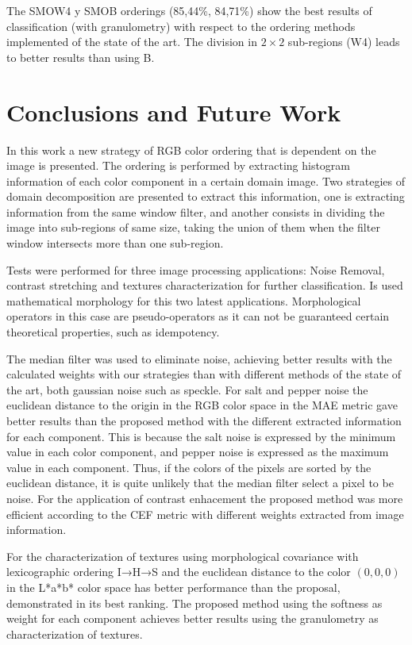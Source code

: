 The SMOW4 y SMOB orderings (85,44\%, 84,71\%) show the best results of classification (with granulometry) with respect to the ordering methods implemented of the state of the art. The division in $2\times2$ sub-regions (W4) leads to better results than using B.  

\section{Conclusions and Future Work}

In this work a new strategy of RGB color ordering that is dependent on the image is presented. The ordering is performed by extracting histogram information of each color component in a certain domain image. Two strategies of domain decomposition are presented to extract this information, one is extracting information from the same window filter, and another consists in dividing the image into sub-regions of same size, taking the union of them when the filter window intersects more than one sub-region.

Tests were performed for three image processing applications: Noise Removal, contrast stretching and textures characterization for further classification. Is used mathematical morphology for this two latest applications. Morphological operators in this case are pseudo-operators as it can not be guaranteed certain theoretical properties, such as idempotency.

The median filter was used to eliminate noise, achieving better results with the calculated weights with our strategies than with different methods of the state of the art, both gaussian noise such as speckle. For salt and pepper noise the euclidean distance to the origin in the RGB color space in the MAE metric gave better results than the proposed method with the different extracted information for each component. This is because the salt noise is expressed by the minimum value in each color component, and pepper noise is expressed as the maximum value in each component. Thus, if the colors of the pixels are sorted by the euclidean distance, it is quite unlikely that the median filter select a pixel to be noise. 
For the application of contrast enhacement the proposed method was more efficient according to the CEF metric with different weights extracted from image information.

For the characterization of textures using morphological covariance with lexicographic ordering I→H→S \cite{ortiz2004gaussian} and the euclidean distance to the color $(0,0,0)$ in the L*a*b* color space \cite{ortiz2002procesamiento} has better performance than the proposal, demonstrated in its best ranking. The proposed method using the softness as weight for each component achieves better results using the granulometry as characterization of textures.

